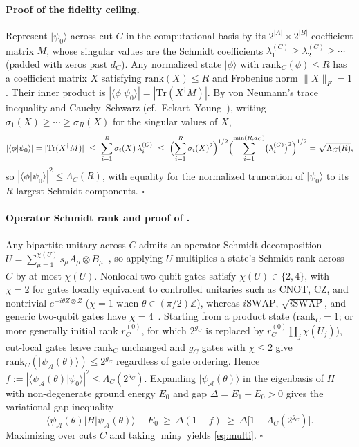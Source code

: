 \documentclass[reprint,aps,pra,floatfix,superscriptaddress,nofootinbib,longbibliography]{revtex4-2}
\theoremstyle{remark}
\theoremstyle{definition}
\newcommand{\calA}{\mathcal{A}}
\newcommand{\ket}[1]{\lvert #1 \rangle}
\newcommand{\bra}[1]{\langle #1 \rvert}
\newcommand{\braket}[2]{\langle #1 \vert #2 \rangle}
\newcommand{\rank}{\mathrm{rank}}
\newcommand{\Tr}{\mathrm{Tr}}
\begin{document}
\paragraph{Proof of the fidelity ceiling.}
Represent $\ket{\psi_0}$ across cut $C$ in the computational basis by its
$2^{|A|}\times2^{|B|}$ coefficient matrix $M$, whose singular values are the
Schmidt coefficients $\lambda_1^{(C)}\ge\lambda_2^{(C)}\ge\cdots$ (padded with
zeros past $d_C$). Any normalized state $\ket{\phi}$ with $\rank_C(\phi)\le R$
has a coefficient matrix $X$ satisfying $\rank(X)\le R$ and Frobenius norm
$\|X\|_F=1$. Their inner product is $|\braket{\phi}{\psi_0}|=|\Tr(X^\dagger M)|$.
By von Neumann's trace inequality and Cauchy--Schwarz
(cf.\ Eckart--Young~\cite{eckart1936approximation}), writing
$\sigma_1(X)\ge\cdots\ge\sigma_R(X)$ for the singular values of $X$,
\begin{equation}
  |\braket{\phi}{\psi_0}|=|\Tr(X^\dagger M)|
  \ \le\ \sum_{i=1}^R\sigma_i(X)\,\lambda_i^{(C)}
  \ \le\ \Bigl(\sum_{i=1}^R\sigma_i(X)^2\Bigr)^{1/2}
         \Bigl(\sum_{i=1}^{\min(R,d_C)}\bigl(\lambda_i^{(C)}\bigr)^2\Bigr)^{1/2}
  =\sqrt{\Lambda_C(R)},
\end{equation}
so $|\braket{\phi}{\psi_0}|^2\le\Lambda_C(R)$, with equality for the normalized
truncation of $\ket{\psi_0}$ to its $R$ largest Schmidt components.
\hfill$\square$

\paragraph{Operator Schmidt rank and proof of .}
Any bipartite unitary across $C$ admits an operator Schmidt decomposition
$U=\sum_{\mu=1}^{\chi(U)}s_\mu A_\mu\otimes B_\mu$~\cite{nielsen2003quantum}, so
applying $U$ multiplies a state's Schmidt rank across $C$ by at most $\chi(U)$.
Nonlocal two-qubit gates satisfy $\chi(U)\in\{2,4\}$, with $\chi=2$ for gates
locally equivalent to controlled unitaries such as CNOT, CZ, and nontrivial
$e^{-i\theta Z\otimes Z}$ ($\chi=1$ when $\theta\in(\pi/2)\mathbb{Z}$), whereas
$i\mathrm{SWAP}$, $\sqrt{i\mathrm{SWAP}}$, and generic two-qubit gates have
$\chi=4$~\cite{vatan2004optimal,balakrishnan2010operator}. Starting from a
product state ($\rank_C=1$; or more generally initial rank $r_C^{(0)}$, for
which $2^{g_C}$ is replaced by $r_C^{(0)}\prod_j\chi(U_j)$), cut-local gates
leave $\rank_C$ unchanged and $g_C$ gates with $\chi\le2$ give
$\rank_C(\ket{\psi_\calA(\theta)})\le2^{g_C}$ regardless of gate ordering. Hence
$f:=|\braket{\psi_\calA(\theta)}{\psi_0}|^2\le\Lambda_C(2^{g_C})$. Expanding
$\ket{\psi_\calA(\theta)}$ in the eigenbasis of $H$ with non-degenerate ground
energy $E_0$ and gap $\Delta=E_1-E_0>0$ gives the variational gap inequality
\begin{equation}
  \label{eq:vargap}
  \bra{\psi_\calA(\theta)}H\ket{\psi_\calA(\theta)}-E_0
  \ \ge\ \Delta(1-f)\ \ge\ \Delta\bigl[1-\Lambda_C(2^{g_C})\bigr].
\end{equation}
Maximizing over cuts $C$ and taking $\min_\theta$ yields \eqref{eq:multi}.
\hfill$\square$
\end{document}

